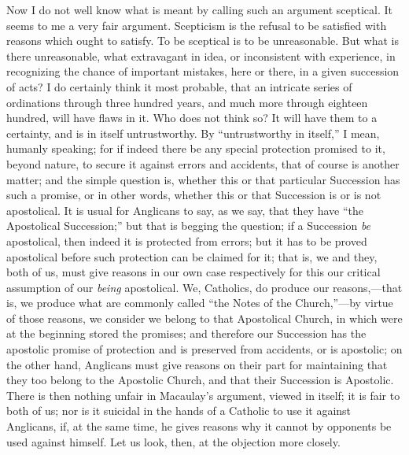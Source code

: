 Now I do not well know what is meant by calling such an argument
sceptical. It seems to me a very fair argument. Scepticism is the
refusal to be satisfied with reasons which ought to satisfy. To be
sceptical is to be unreasonable. But what is there unreasonable, what
extravagant in idea, or inconsistent with experience, in recognizing
the chance of important mistakes, here or there, in a given succession
of acts? I do certainly think it most probable, that an intricate
series of ordinations through three hundred years, and much more
through eighteen hundred, will have flaws in it. Who does not think
so? It will have them to a certainty, and is in itself untrustworthy.
By ``untrustworthy in itself,'' I mean, humanly speaking; for
if indeed there be any special protection promised to it, beyond
nature, to secure it against errors and accidents, that of course is
another matter; and the simple question is, whether this or that
particular Succession has such a promise, or in other words, whether
this or that Succession is or is not apostolical. It is usual for
Anglicans to say, as we say, that they have ``the Apostolical
Succession;'' but that is begging the question; if a Succession \emph{be}
apostolical, then indeed it is protected from errors; but it has to be
proved apostolical before such protection can be claimed for it; that
is, we and they, both of us, must give reasons in our own case
respectively for this our critical assumption of our \emph{being}
apostolical. We, Catholics, do produce our reasons,—that is, we
produce what are commonly called ``the Notes of the Church,''—by
virtue of those reasons, we consider we belong to that Apostolical
Church, in which were at the beginning stored the promises; and
therefore our Succession has the apostolic promise of protection and
is preserved from accidents, or is apostolic; on the other hand,
Anglicans must give reasons on their part for maintaining that
they too belong to the Apostolic Church, and that their Succession is
Apostolic. There is then nothing unfair in Macaulay's argument, viewed
in itself; it is fair to both of us; nor is it suicidal in the hands
of a Catholic to use it against Anglicans, if, at the same time, he
gives reasons why it cannot by opponents be used against himself. Let
us look, then, at the objection more closely.

